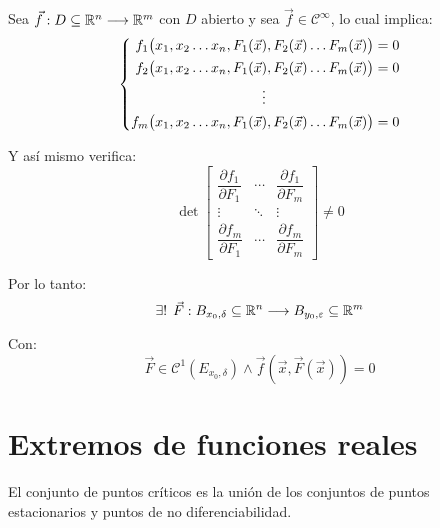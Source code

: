 \documentclass[a5paper,12pt,twoside]{book}
\begin{document}

Sea $\Vec{f}:D \subseteq \mathbb{R}^n \longrightarrow \mathbb{R}^m$ con $D$ abierto y sea $\Vec{f} \in \mathcal{C}^\infty$, lo cual implica:
\begin{equation*}
    \left\{
    \begin{aligned}
        f_1 \big( x_1,x_2 \dots x_n, F_1(\Vec{x}), F_2(\Vec{x}) \dots F_m(\Vec{x}) \big) &= 0
        \\
        f_2 \big( x_1,x_2 \dots x_n, F_1(\Vec{x}), F_2(\Vec{x}) \dots F_m(\Vec{x}) \big) &= 0
        \\
        \vdots \hspace{2.7cm} &
        \\
        f_m \big( x_1,x_2 \dots x_n, F_1(\Vec{x}), F_2(\Vec{x}) \dots F_m(\Vec{x}) \big) &= 0
    \end{aligned}
    \right.
\end{equation*}

Y así mismo verifica:
\begin{equation*}
    \operatorname{det}
    \begin{bmatrix}
        \dfrac{\partial f_1}{\partial F_1} & \cdots & \dfrac{\partial f_1}{\partial F_m}
        \\
        \vdots & \ddots & \vdots
        \\
        \dfrac{\partial f_m}{\partial F_1} & \cdots & \dfrac{\partial f_m}{\partial F_m}
    \end{bmatrix}
    \neq 0
\end{equation*}

Por lo tanto:
\begin{equation*}
    \exists ! \hspace{1ex} \Vec{F}: B_{x_0,\delta} \subseteq \mathbb{R}^n \longrightarrow B_{y_0,\varepsilon} \subseteq \mathbb{R}^m
\end{equation*}

Con:
\begin{equation*}
    \Vec{F} \in \mathcal{C}^1(E_{x_0, \delta}) \land \Vec{f}(\Vec{x}, \Vec{F}(\Vec{x}))=0
\end{equation*}


\chapter{Extremos de funciones reales}


El conjunto de puntos críticos es la unión de los conjuntos de puntos estacionarios y puntos de no diferenciabilidad.
\end{document}
